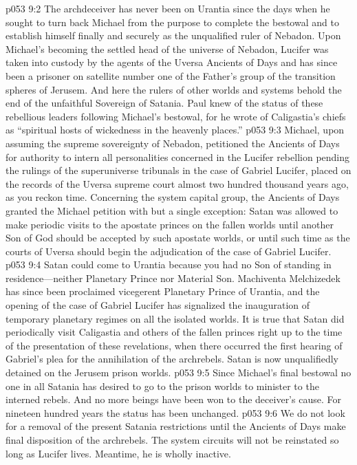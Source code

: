 \pc \vs p053 9:2 The archdeceiver has never been on Urantia since the days when he sought to turn back Michael from the purpose to complete the bestowal and to establish himself finally and securely as the unqualified ruler of Nebadon. Upon Michael’s becoming the settled head of the universe of Nebadon, Lucifer was taken into custody by the agents of the Uversa Ancients of Days and has since been a prisoner on satellite number one of the Father’s group of the transition spheres of Jerusem. And here the rulers of other worlds and systems behold the end of the unfaithful Sovereign of Satania. Paul knew of the status of these rebellious leaders following Michael’s bestowal, for he wrote of Caligastia’s chiefs as “spiritual hosts of wickedness in the heavenly places.”
\pc \vs p053 9:3 Michael, upon assuming the supreme sovereignty of Nebadon, petitioned the Ancients of Days for authority to intern all personalities concerned in the Lucifer rebellion pending the rulings of the superuniverse tribunals in the case of Gabriel  Lucifer, placed on the records of the Uversa supreme court almost two hundred thousand years ago, as you reckon time. Concerning the system capital group, the Ancients of Days granted the Michael petition with but a single exception: Satan was allowed to make periodic visits to the apostate princes on the fallen worlds until another Son of God should be accepted by such apostate worlds, or until such time as the courts of Uversa should begin the adjudication of the case of Gabriel  Lucifer.
\vs p053 9:4 Satan could come to Urantia because you had no Son of standing in residence---neither Planetary Prince nor Material Son. Machiventa Melchizedek has since been proclaimed vicegerent Planetary Prince of Urantia, and the opening of the case of Gabriel  Lucifer has signalized the inauguration of temporary planetary regimes on all the isolated worlds. It is true that Satan did periodically visit Caligastia and others of the fallen princes right up to the time of the presentation of these revelations, when there occurred the first hearing of Gabriel’s plea for the annihilation of the archrebels. Satan is now unqualifiedly detained on the Jerusem prison worlds.
\pc \vs p053 9:5 Since Michael’s final bestowal no one in all Satania has desired to go to the prison worlds to minister to the interned rebels. And no more beings have been won to the deceiver’s cause. For nineteen hundred years the status has been unchanged.
\vs p053 9:6 We do not look for a removal of the present Satania restrictions until the Ancients of Days make final disposition of the archrebels. The system circuits will not be reinstated so long as Lucifer lives. Meantime, he is wholly inactive.
